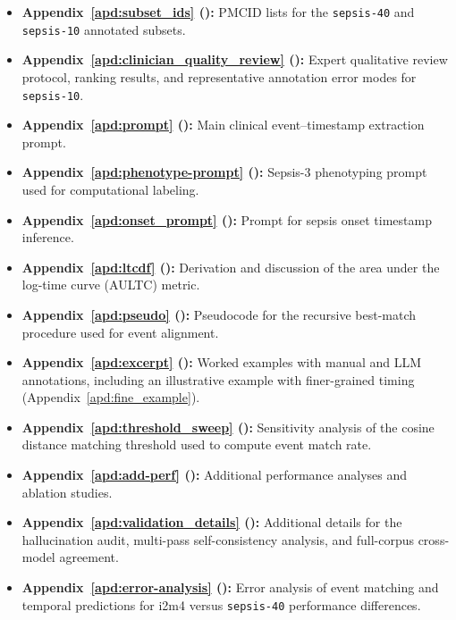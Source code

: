\documentclass[pmlr,twocolumn,10pt]{jmlr} %
\begin{document}
\begin{itemize}
    \item \textbf{Appendix~\ref{apd:subset_ids} ():} PMCID lists for the \texttt{sepsis-40} and \texttt{sepsis-10} annotated subsets.

    \item \textbf{Appendix~\ref{apd:clinician_quality_review} ():} Expert qualitative review protocol, ranking results, and representative annotation error modes for \texttt{sepsis-10}.

    \item \textbf{Appendix~\ref{apd:prompt} ():} Main clinical event--timestamp extraction prompt.

    \item \textbf{Appendix~\ref{apd:phenotype-prompt} ():} Sepsis-3 phenotyping prompt used for computational labeling.

    \item \textbf{Appendix~\ref{apd:onset_prompt} ():} Prompt for sepsis onset timestamp inference.

    \item \textbf{Appendix~\ref{apd:ltcdf} ():} Derivation and discussion of the area under the log-time curve (AULTC) metric.

    \item \textbf{Appendix~\ref{apd:pseudo} ():} Pseudocode for the recursive best-match procedure used for event alignment.

    \item \textbf{Appendix~\ref{apd:excerpt} ():} Worked examples with manual and LLM annotations, including an illustrative example with finer-grained timing (Appendix~\ref{apd:fine_example}).

    \item \textbf{Appendix~\ref{apd:threshold_sweep} ():} Sensitivity analysis of the cosine distance matching threshold used to compute event match rate.

    \item \textbf{Appendix~\ref{apd:add-perf} ():} Additional performance analyses and ablation studies.

    \item \textbf{Appendix~\ref{apd:validation_details} ():} Additional details for the hallucination audit, multi-pass self-consistency analysis, and full-corpus cross-model agreement.

    \item \textbf{Appendix~\ref{apd:error-analysis} ():} Error analysis of event matching and temporal predictions for i2m4 versus \texttt{sepsis-40} performance differences.
\end{itemize}
\end{document}
